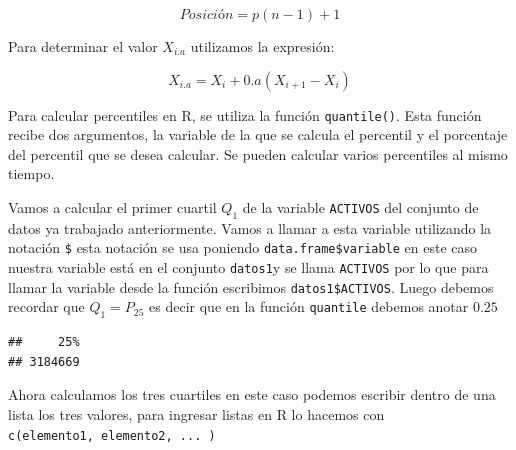 \documentclass[]{book}
\newenvironment{Shaded}{\begin{snugshade}}{\end{snugshade}}
\newcommand{\KeywordTok}[1]{\textcolor[rgb]{0.13,0.29,0.53}{\textbf{#1}}}
\newcommand{\FloatTok}[1]{\textcolor[rgb]{0.00,0.00,0.81}{#1}}
\newcommand{\OperatorTok}[1]{\textcolor[rgb]{0.81,0.36,0.00}{\textbf{#1}}}
\newcommand{\NormalTok}[1]{#1}
\begin{document}
\begin{equation} 
  Posición = p(n-1)+1
  \label{eq:posperc}
\end{equation}

Para determinar el valor \(X_{i.a}\) utilizamos la expresión:

\begin{equation} 
  X_{i.a}=X_{i}+0.a(X_{i+1}-X_{i})
  \label{eq:valperc}
\end{equation}

Para calcular percentiles en R, se utiliza la función
\texttt{quantile()}. Esta función recibe dos argumentos, la variable de
la que se calcula el percentil y el porcentaje del percentil que se
desea calcular. Se pueden calcular varios percentiles al mismo tiempo.

Vamos a calcular el primer cuartil \(Q_{1}\) de la variable
\texttt{ACTIVOS} del conjunto de datos ya trabajado anteriormente. Vamos
a llamar a esta variable utilizando la notación \texttt{\$} esta
notación se usa poniendo \texttt{data.frame\$variable} en este caso
nuestra variable está en el conjunto \texttt{datos1}y se llama
\texttt{ACTIVOS} por lo que para llamar la variable desde la función
escribimos \texttt{datos1\$ACTIVOS}. Luego debemos recordar que
\(Q_1=P_{25}\) es decir que en la función \texttt{quantile} debemos
anotar \(0.25\)

\begin{Shaded}
\end{Shaded}

\begin{verbatim}
##     25% 
## 3184669
\end{verbatim}

Ahora calculamos los tres cuartiles en este caso podemos escribir dentro
de una lista los tres valores, para ingresar listas en R lo hacemos con
\texttt{c(elemento1,\ elemento2,\ ...\ )}

\begin{Shaded}
\end{Shaded}
\end{document}
